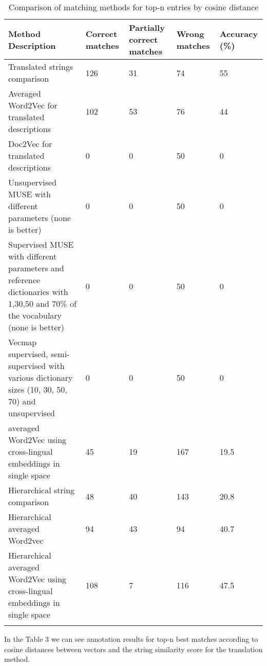 \documentclass[conference]{IEEEtran}
\begin{document}
\begin{center}
\begin{table}[!htbp]
\caption{Comparison of matching methods for top-n entries by cosine distance}
\begin{tabular}{p{3.3cm}|p{0.8cm}|p{0.9cm}|p{0.8cm}|p{0.8cm}}
  Method \newline Description & Correct matches & Partially correct matches & Wrong matches &
  Accuracy \newline (\%)\\
  \hline
  \hline
  Translated strings comparison & 126 & 31 & 74 & 55\\
  \hline
  Averaged Word2Vec for translated descriptions & 102 & 53 & 76 & 44\\
  \hline
  Doc2Vec for translated descriptions & 0 & 0 & 50 & 0\\
  \hline
  Unsupervised MUSE with different parameters (none is better) & 0 & 0 & 50 & 0\\
  \hline
  Supervised MUSE with different parameters and reference dictionaries with 1,30,50 and 70\% of the vocabulary (none is better) & 0 & 0 & 50 & 0\\
  \hline
  Vecmap supervised, semi-supervised with various dictionary sizes (10, 30, 50, 70) and unsupervised  & 0 & 0 & 50 & 0\\
    \hline
  averaged Word2Vec using cross-lingual embeddings in single space  & 45 & 19 & 167 & 19.5\\
    \hline
    Hierarchical string comparison & 48 & 40 & 143 & 20.8\\
    \hline
    Hierarchical averaged Word2vec & 94 & 43 & 94 & 40.7\\
    \hline
    Hierarchical averaged Word2Vec using cross-lingual embeddings in single space  & 108 & 7 & 116 & 47.5\\
\label{table-accuracies}
\end{tabular}
\end{table}
\end{center}

In the Table 3 we can see annotation results for top-n best matches according to cosine distances between vectors and the string similarity score for the translation method.
\end{document}
